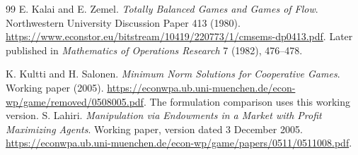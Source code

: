 \documentclass[11pt]{article}
\theoremstyle{definition}
\theoremstyle{remark}
\begin{document}
\begin{thebibliography}{99}
E. Kalai and E. Zemel.
\emph{Totally Balanced Games and Games of Flow}.
Northwestern University Discussion Paper 413 (1980).
\url{https://www.econstor.eu/bitstream/10419/220773/1/cmsems-dp0413.pdf}.
Later published in \emph{Mathematics of Operations Research} 7 (1982), 476--478.

K. Kultti and H. Salonen.
\emph{Minimum Norm Solutions for Cooperative Games}.
Working paper (2005).
\url{https://econwpa.ub.uni-muenchen.de/econ-wp/game/removed/0508005.pdf}.
The formulation comparison uses this working version.
S. Lahiri.
\emph{Manipulation via Endowments in a Market with Profit Maximizing Agents}.
Working paper, version dated 3 December 2005.
\url{https://econwpa.ub.uni-muenchen.de/econ-wp/game/papers/0511/0511008.pdf}.
\end{thebibliography}
\end{document}
